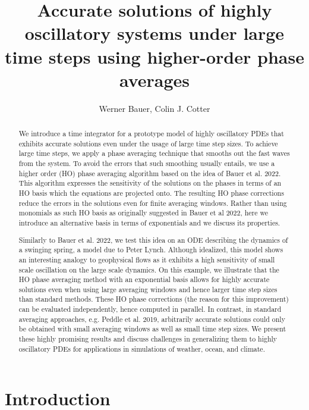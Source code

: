 \documentclass[a4,12pt]{article}
\title{Accurate solutions of highly oscillatory systems under large time steps using higher-order phase averages}
\author{Werner Bauer, Colin J. Cotter}
\begin{document}
\maketitle


\begin{abstract}
We introduce a time integrator for a prototype model of highly oscillatory PDEs that exhibits accurate solutions even under the usage of large time step sizes. To achieve large time steps, we apply a phase averaging technique that smooths out the fast waves from the system. To avoid the errors that such smoothing usually entails, we use a higher order (HO) phase averaging algorithm based on the idea of Bauer et al. 2022. %
This algorithm expresses the sensitivity of the solutions on the phases in terms of an HO basis which the equations are projected onto. The resulting HO phase corrections reduce the errors in the solutions even for finite averaging windows. Rather than using monomials as such HO basis as originally suggested in Bauer et al 2022, %
here we introduce an alternative basis in terms of exponentials and we discuss its properties.

Similarly to Bauer et al. 2022, %
we test this idea on an ODE describing the dynamics of a swinging spring, a model due to Peter Lynch. Although idealized, this model shows an interesting analogy to geophysical flows as it exhibits a high sensitivity of small scale oscillation on the large scale dynamics. On this example, we illustrate that the HO phase averaging method with an exponential basis allows for highly accurate solutions even when using large averaging windows and hence larger time step sizes than standard methods. These HO phase corrections (the reason for this improvement) can be evaluated independently, hence computed in parallel. In contrast, in standard averaging approaches, e.g. Peddle et al. 2019, %
arbitrarily accurate solutions could only be obtained with small averaging windows as well as small time step sizes.  We present these highly promising results and discuss challenges in generalizing them to highly oscillatory PDEs for applications in simulations of weather, ocean, and climate.

\end{abstract}


\section{Introduction}
\end{document}
